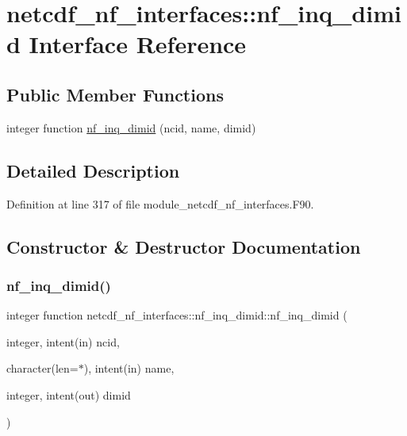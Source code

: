 \hypertarget{interfacenetcdf__nf__interfaces_1_1nf__inq__dimid}{}\section{netcdf\+\_\+nf\+\_\+interfaces\+:\+:nf\+\_\+inq\+\_\+dimid Interface Reference}
\label{interfacenetcdf__nf__interfaces_1_1nf__inq__dimid}
\subsection*{Public Member Functions}
\begin{DoxyCompactItemize}
\item 
integer function \hyperlink{interfacenetcdf__nf__interfaces_1_1nf__inq__dimid_aacddc17bf269f35f1fdf7ee2cb37443d}{nf\+\_\+inq\+\_\+dimid} (ncid, name, dimid)
\end{DoxyCompactItemize}


\subsection{Detailed Description}


Definition at line 317 of file module\+\_\+netcdf\+\_\+nf\+\_\+interfaces.\+F90.



\subsection{Constructor \& Destructor Documentation}
\mbox{\label{interfacenetcdf__nf__interfaces_1_1nf__inq__dimid_aacddc17bf269f35f1fdf7ee2cb37443d}} 
\subsubsection{\texorpdfstring{nf\+\_\+inq\+\_\+dimid()}{nf\_inq\_dimid()}}
{\footnotesize\ttfamily integer function netcdf\+\_\+nf\+\_\+interfaces\+::nf\+\_\+inq\+\_\+dimid\+::nf\+\_\+inq\+\_\+dimid (\begin{DoxyParamCaption}\item[{integer, intent(in)}]{ncid,  }\item[{character(len=$\ast$), intent(in)}]{name,  }\item[{integer, intent(out)}]{dimid }\end{DoxyParamCaption})}



